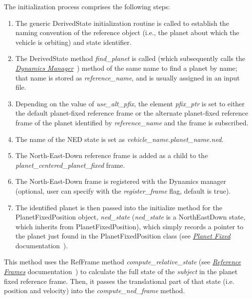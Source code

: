 \begin{itemize}
\begin{enumerate}
The initialization process comprises the following steps:
\begin{enumerate}
\item{} The generic DerivedState initialization routine is called to establish the naming convention of the reference object (i.e., the planet about which the vehicle is orbiting) and state identifier.
\item{} The DerivedState method \textit{find\_planet} is called (which subsequently calls the  \href{file:\JEODHOME/models/dynamics/dyn_manager/docs/dyn_manager.pdf}{\em Dynamics Manager}~\cite{dynenv:DYNMANAGER}) method of the same name to find a planet by name; that name is stored as \textit{reference\_name}, and is usually assigned in an input file.
\item{} Depending on the value of \textit{use\_alt\_pfix}, the element \textit{pfix\_ptr} is set to either the default planet-fixed reference frame or the alternate planet-fixed reference frame of the planet identified by \textit{reference\_name} and the frame is subscribed.
\item{} The name of the NED state is set as \textit{vehicle\_name.planet\_name.ned}.
\item{} The North-East-Down reference frame is added as a child to the \textit{planet\_centered\_planet\_fixed} frame.
\item{} The North-East-Down frame is registered with the Dynamics manager (optional, user can specify with the \textit{register\_frame} flag, default is true).
\item {} The identified planet is then passed into the initialize method for the PlanetFixedPosition object, \textit{ned\_state} (\textit{ned\_state} is a NorthEastDown state, which inherits from PlanetFixedPosition), which simply records a pointer to the planet just found in the PlanetFixedPosition class (see \href{file:\JEODHOME/models/utils/planet\_fixed/docs/planet\_fixed.pdf}{\em Planet Fixed} documentation~\cite{dynenv:PLANETFIXED}).
\end{enumerate}

This method uses the RefFrame method \textit{compute\_relative\_state} (see \href{file:\JEODHOME/models/utils/ref\_frames/docs/ref\_frames.pdf}{\em Reference Frames} documentation~\cite{dynenv:REFFRAMES}) to calculate the full state of the \textit{subject} in the planet fixed reference frame.  Then, it passes the translational part of that state (i.e. position and velocity) into the \textit{compute\_ned\_frame} method.

\end{enumerate}
\end{itemize}
